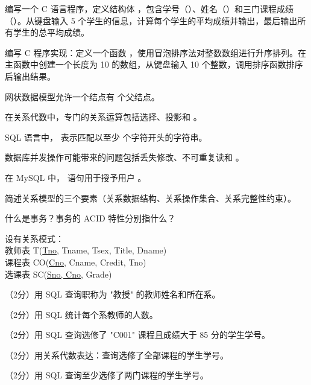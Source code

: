 \documentclass[a4paper,11pt]{article}
\begin{document}

\pq 编写一个 C 语言程序，定义结构体 ，包含学号（）、姓名（）和三门课程成绩（）。从键盘输入 5 个学生的信息，计算每个学生的平均成绩并输出，最后输出所有学生的总平均成绩。
\anslines{6cm}

\pq 编写 C 程序实现：定义一个函数 ，使用冒泡排序法对整数数组进行升序排列。在主函数中创建一个长度为 10 的数组，从键盘输入 10 个整数，调用排序函数排序后输出结果。
\anslines{6cm}



\q 网状数据模型允许一个结点有 \fillblank 个父结点。

\q 在关系代数中，专门的关系运算包括选择、投影和 \fillblank 。

\q SQL 语言中， 表示匹配以至少 \fillblank 个字符开头的字符串。

\q 数据库并发操作可能带来的问题包括丢失修改、不可重复读和 \fillblank 。

\q 在 MySQL 中， 语句用于授予用户 \fillblank 。


\q 简述关系模型的三个要素（关系数据结构、关系操作集合、关系完整性约束）。
\anslines{3cm}

\q 什么是事务？事务的 ACID 特性分别指什么？
\anslines{3cm}


设有关系模式：\\
教师表 T(\underline{Tno}, Tname, Tsex, Title, Dname)\\
课程表 CO(\underline{Cno}, Cname, Credit, Tno)\\
选课表 SC(\underline{Sno, Cno}, Grade)

\q （2分）用 SQL 查询职称为 "教授" 的教师姓名和所在系。
\anslines{0.8cm}

\q （2分）用 SQL 统计每个系教师的人数。
\anslines{0.8cm}

\q （2分）用 SQL 查询选修了 "C001" 课程且成绩大于 85 分的学生学号。
\anslines{0.8cm}

\q （2分）用关系代数表达：查询选修了全部课程的学生学号。
\anslines{1.2cm}

\q （2分）用 SQL 查询至少选修了两门课程的学生学号。
\anslines{0.8cm}
\end{document}
